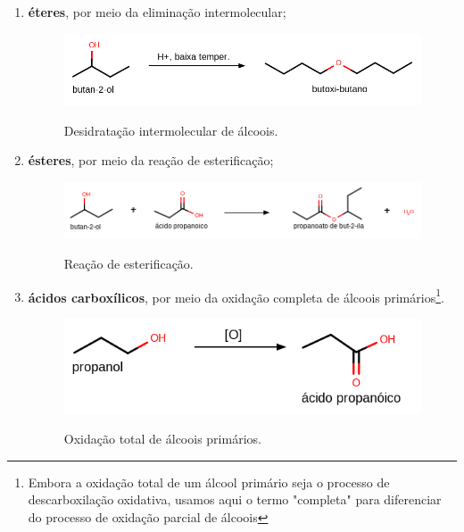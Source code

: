 \begin{enumerate}
    \item \textbf{éteres}, por meio da eliminação intermolecular;
    \begin{figure}[h]
        \centering
        \caption{Desidratação intermolecular de álcoois.}
        \vspace{0.5cm}
        \includegraphics[width=1\linewidth]{imagens/alcooleter.png}
    \label{fig:alcooleter}
    \end{figure}

    \item \textbf{ésteres}, por meio da reação de esterificação;
    \begin{figure}[h]
        \centering
        \caption{Reação de esterificação.}
        \vspace{0.5cm}
        \includegraphics[width=1\linewidth]{imagens/esterificacao.png}
    \label{fig:alcoolester}
    \end{figure}

    \item \textbf{ácidos carboxílicos}, por meio da oxidação completa de álcoois primários\footnote{Embora a oxidação total de um álcool primário seja o processo de descarboxilação oxidativa, usamos aqui o termo "completa" para diferenciar do processo de oxidação parcial de álcoois}. 
    \begin{figure}[h]
        \centering
        \caption{Oxidação total de álcoois primários.}
        \vspace{0.5cm}
        \includegraphics[width=0.85\linewidth]{imagens/alcoolacido.png}
    \label{fig:alcoolacido}
    \end{figure}
\end{enumerate}

